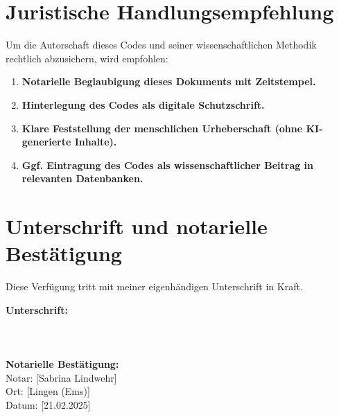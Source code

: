 \documentclass[a4paper,12pt]{article}
\begin{document}
\section{Juristische Handlungsempfehlung}
Um die Autorschaft dieses Codes und seiner wissenschaftlichen Methodik rechtlich abzusichern, wird empfohlen:
\begin{enumerate}
    \item \textbf{Notarielle Beglaubigung dieses Dokuments mit Zeitstempel.}
    \item \textbf{Hinterlegung des Codes als digitale Schutzschrift.}
    \item \textbf{Klare Feststellung der menschlichen Urheberschaft (ohne KI-generierte Inhalte).}
    \item \textbf{Ggf. Eintragung des Codes als wissenschaftlicher Beitrag in relevanten Datenbanken.}
\end{enumerate}

\section{Unterschrift und notarielle Bestätigung}
\noindent Diese Verfügung tritt mit meiner eigenhändigen Unterschrift in Kraft.

\vspace{1.5cm}
\noindent \textbf{Unterschrift:} \\
\vspace{2cm}
 \\
[Datum] \\
[Ort] \\

\vspace{2cm}
\noindent \textbf{Notarielle Bestätigung:} \\
\vspace{2cm}
\noindent Notar: [Sabrina Lindwehr] \\
\noindent Ort: [Lingen (Ems)] \\
\noindent Datum: [21.02.2025] \\
\end{document}
